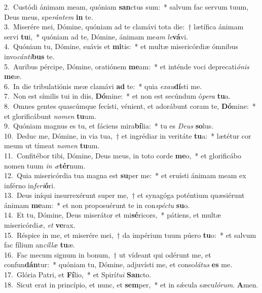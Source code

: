 {2.~}Custódi ánimam meam, quóniam \textbf{san}ctus sum:~* salvum fac servum tuum, Deus meus, spe\textit{rán}\textit{tem} \textbf{in} te.\\
{3.~}Miserére mei, Dómine, quóniam ad te clamávi tota die:~† lætífica ánimam servi \textbf{tu}i,~* quóniam ad te, Dómine, ánimam me\textit{am} \textit{le}\textbf{vá}vi.\\
{4.~}Quóniam tu, Dómine, suávis et \textbf{mi}tis:~* et multæ misericórdiæ ómnibus invo\textit{cán}\textit{ti}\textbf{bus} te.\\
{5.~}Auribus pércipe, Dómine, oratiónem \textbf{me}am:~* et inténde voci deprecati\textit{ó}\textit{nis} \textbf{me}æ.\\
{6.~}In die tribulatiónis meæ clamávi \textbf{ad} te:~* quia \textit{e}\textit{xau}\textbf{dí}sti me.\\
{7.~}Non est símilis tui in diis, \textbf{Dó}mine:~* et non est secúndum ó\textit{pe}\textit{ra} \textbf{tu}a.\\
{8.~}Omnes gentes quascúmque fecísti, vénient, et adorábunt coram te, \textbf{Dó}mine:~* et glorificábunt \textit{no}\textit{men} \textbf{tu}um.\\
{9.~}Quóniam magnus es tu, et fáciens mira\textbf{bí}lia:~* tu es \textit{De}\textit{us} \textbf{so}lus.\\
{10.~}Deduc me, Dómine, in via tua,~† et ingrédiar in veritáte \textbf{tu}a:~* lætétur cor meum ut tímeat \textit{no}\textit{men} \textbf{tu}um.\\
{11.~}Confitébor tibi, Dómine, Deus meus, in toto corde \textbf{me}o,~* et glorificábo nomen tuum \textit{in} \textit{æ}\textbf{tér}num.\\
{12.~}Quia misericórdia tua magna est \textbf{su}per me:~* et eruísti ánimam meam ex inférno in\textit{fe}\textit{ri}\textbf{ó}ri.\\
{13.~}Deus iníqui insurrexérunt super me,~† et synagóga poténtium quæsiérunt ánimam \textbf{me}am:~* et non proposuérunt te in con\textit{spé}\textit{ctu} \textbf{su}o.\\
{14.~}Et tu, Dómine, Deus miserátor et mi\textbf{sé}ricors,~* pátiens, et multæ misericórdi\textit{æ}, \textit{et} \textbf{ve}rax.\\
{15.~}Réspice in me, et miserére mei,~† da impérium tuum púero \textbf{tu}o:~* et salvum fac fílium an\textit{cíl}\textit{læ} \textbf{tu}æ.\\
{16.~}Fac mecum signum in bonum,~† ut vídeant qui odérunt me, et confun\textbf{dán}tur:~* quóniam tu, Dómine, adjuvísti me, et conso\textit{lá}\textit{tus} \textbf{es} me.\\
{17.~}Glória Patri, et \textbf{Fí}lio,~* et Spirí\textit{tu}\textit{i} \textbf{San}cto.\\
{18.~}Sicut erat in princípio, et nunc, et \textbf{sem}per,~* et in sǽcula sæcu\textit{ló}\textit{rum}. \textbf{A}men.\\
